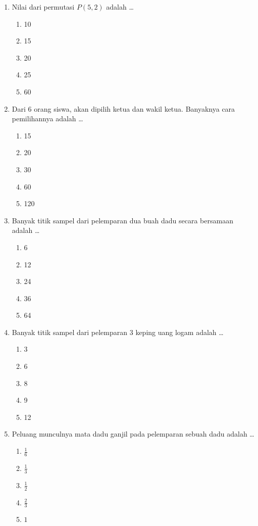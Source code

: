 \documentclass[12pt,a4paper]{article}
\begin{document}
\begin{enumerate}[leftmargin=*]
\item Nilai dari permutasi $P(5, 2)$ adalah \dots
    \begin{enumerate}[label=\alph*.]
        \item 10
        \item 15
        \item 20
        \item 25
        \item 60
    \end{enumerate}

\item Dari 6 orang siswa, akan dipilih ketua dan wakil ketua. Banyaknya cara pemilihannya adalah \dots
    \begin{enumerate}[label=\alph*.]
        \item 15
        \item 20
        \item 30
        \item 60
        \item 120
    \end{enumerate}

\item Banyak titik sampel dari pelemparan dua buah dadu secara bersamaan adalah \dots
    \begin{enumerate}[label=\alph*.]
        \item 6
        \item 12
        \item 24
        \item 36
        \item 64
    \end{enumerate}

\item Banyak titik sampel dari pelemparan 3 keping uang logam adalah \dots
    \begin{enumerate}[label=\alph*.]
        \item 3
        \item 6
        \item 8
        \item 9
        \item 12
    \end{enumerate}

\item Peluang munculnya mata dadu ganjil pada pelemparan sebuah dadu adalah \dots
    \begin{enumerate}[label=\alph*.]
        \item $\frac{1}{6}$
        \item $\frac{1}{3}$
        \item $\frac{1}{2}$
        \item $\frac{2}{3}$
        \item $1$
    \end{enumerate}


\end{enumerate}
\end{document}
